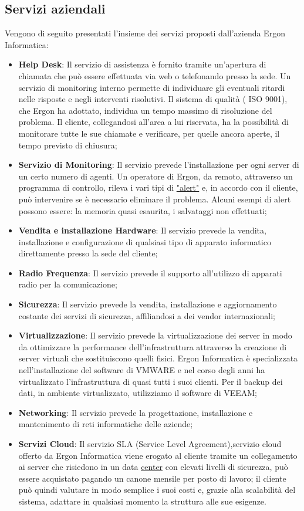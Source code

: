 \subsection{Servizi aziendali}
Vengono di seguito presentati l'insieme dei servizi proposti dall'azienda Ergon Informatica:
\begin{itemize}
	\item \textbf{Help Desk}: Il servizio di assistenza è fornito tramite un'apertura di chiamata che può essere effettuata via web o telefonando presso la sede.
	Un servizio di monitoring  interno permette di individuare gli eventuali ritardi nelle risposte e negli interventi risolutivi. Il sistema di qualità ( ISO 9001), che Ergon ha adottato, individua un tempo massimo di risoluzione del problema.
	Il cliente, collegandosi all'area a lui riservata, ha la possibilità di monitorare tutte le sue chiamate e verificare, per quelle ancora aperte,
	 il tempo  previsto di chiusura;
	\item \textbf{Servizio di Monitoring}: Il servizio prevede l'installazione per ogni server di un certo numero di agenti.
	Un operatore di Ergon, da remoto, attraverso un programma di controllo, rileva i vari tipi di \hyperref[Alert]{"alert"\glosp}  e, in accordo con il cliente, 
	 può intervenire se è necessario eliminare il problema. Alcuni esempi di alert possono essere: la memoria quasi esaurita, i salvataggi non effettuati;
	\item \textbf{Vendita e installazione Hardware}: Il servizio prevede la vendita, installazione e configurazione di qualsiasi tipo di 
	apparato informatico direttamente presso la sede del cliente;
	\item \textbf{Radio Frequenza}: Il servizio prevede il supporto all'utilizzo di apparati radio per la comunicazione;
	\item \textbf{Sicurezza}: Il servizio prevede la vendita, installazione e aggiornamento costante dei servizi di sicurezza, affiliandosi a dei vendor internazionali;
	\item \textbf{Virtualizzazione}: Il servizio prevede la virtualizzazione dei server in modo da ottimizzare la performance dell'infrastruttura attraverso la creazione di server virtuali che sostituiscono quelli fisici. Ergon Informatica è specializzata nell'installazione del software di VMWARE e nel corso degli anni ha virtualizzato l'infrastruttura di quasi tutti i suoi clienti.
	Per il backup dei dati,  in ambiente virtualizzato, utilizziamo il software di VEEAM;
	\item \textbf{Networking}: Il servizio prevede la progettazione, installazione e mantenimento di reti informatiche delle aziende;
	\item \textbf{Servizi Cloud}: Il servizio SLA (Service Level Agreement),servizio cloud offerto da Ergon Informatica viene erogato al cliente tramite un
	 collegamento ai server che risiedono in un data \hyperref[Data center]{center\glosp} con elevati livelli di sicurezza, può essere acquistato pagando un canone mensile per posto di lavoro; il cliente può quindi valutare in modo semplice i suoi costi e, grazie alla scalabilità del sistema, adattare in qualsiasi momento la struttura alle sue esigenze.

\end{itemize}


